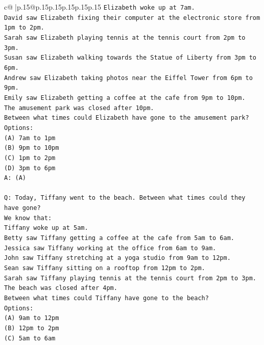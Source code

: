\documentclass{article}
\begin{document}
{\begin{supertabular}{c@{$\;$}|p{.15\linewidth}@{}p{.15\linewidth}p{.15\linewidth}p{.15\linewidth}p{.15\linewidth}p{.15\linewidth}}
{{{\texttt{Elizabeth woke up at 7am.} \\
\texttt{David saw Elizabeth fixing their computer at the electronic store from 1pm to 2pm.} \\
\texttt{Sarah saw Elizabeth playing tennis at the tennis court from 2pm to 3pm.} \\
\texttt{Susan saw Elizabeth walking towards the Statue of Liberty from 3pm to 6pm.} \\
\texttt{Andrew saw Elizabeth taking photos near the Eiffel Tower from 6pm to 9pm.} \\
\texttt{Emily saw Elizabeth getting a coffee at the cafe from 9pm to 10pm.} \\
\texttt{The amusement park was closed after 10pm.} \\
\texttt{Between what times could Elizabeth have gone to the amusement park?} \\
\texttt{Options:} \\
\texttt{(A) 7am to 1pm} \\
\texttt{(B) 9pm to 10pm} \\
\texttt{(C) 1pm to 2pm} \\
\texttt{(D) 3pm to 6pm} \\
\texttt{A: (A)} \\
\\ 
\texttt{Q: Today, Tiffany went to the beach. Between what times could they have gone?} \\
\texttt{We know that:} \\
\texttt{Tiffany woke up at 5am.} \\
\texttt{Betty saw Tiffany getting a coffee at the cafe from 5am to 6am.} \\
\texttt{Jessica saw Tiffany working at the office from 6am to 9am.} \\
\texttt{John saw Tiffany stretching at a yoga studio from 9am to 12pm.} \\
\texttt{Sean saw Tiffany sitting on a rooftop from 12pm to 2pm.} \\
\texttt{Sarah saw Tiffany playing tennis at the tennis court from 2pm to 3pm.} \\
\texttt{The beach was closed after 4pm.} \\
\texttt{Between what times could Tiffany have gone to the beach?} \\
\texttt{Options:} \\
\texttt{(A) 9am to 12pm} \\
\texttt{(B) 12pm to 2pm} \\
\texttt{(C) 5am to 6am} \\
}}}
\end{supertabular}}
\end{document}
